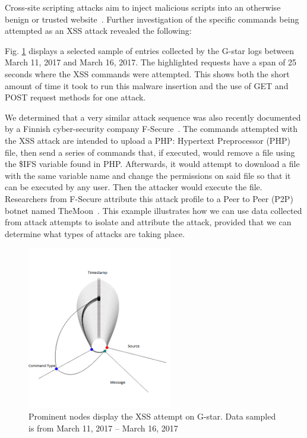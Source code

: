 Cross-site scripting attacks aim to inject malicious scripts into an otherwise benign or trusted website~\cite{XSS-def}. 
Further investigation of the specific commands being attempted as an XSS attack revealed the following:


\noindent Fig. \ref{fig:XSS} displays a selected sample of entries collected by the G-star logs between March 11, 2017 and March 16, 2017. 
The highlighted requests have a span of 25 seconds where the XSS commands were attempted.
This shows both the short amount of time it took to run this malware insertion and the use of GET and POST request methods for one attack.

We determined that a very similar attack sequence was also recently documented by a Finnish cyber-security company F-Secure~\cite{F-Secure}. 
The commands attempted with the XSS attack are intended to upload a PHP: Hypertext Preprocessor (PHP) file, then send a series of commands that, if executed, would remove a file using the \$IFS variable found in PHP. 
Afterwards, it would attempt to download a file with the same variable name and change the permissions on said file so that it can be executed by any user.  
Then the attacker would execute the file. 
Researchers from F-Secure  attribute this attack profile to a Peer to Peer (P2P) botnet named TheMoon~\cite{TheMoon}. 
This example illustrates how we can use data collected from attack attempts to isolate and attribute the attack, provided that we can determine what types of attacks are taking place.

\begin{figure}[t]
   \centering
   \includegraphics[width=2.5in]{images/XSS.png}  
   \caption{Prominent nodes display the XSS attempt on G-star. Data sampled is from March 11, 2017 -- March 16, 2017}
   \label{fig:XSS}
\end{figure}

